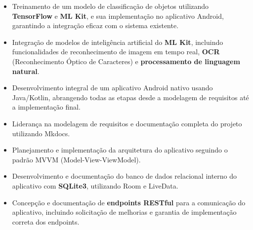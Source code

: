 \documentclass[a4paper,12pt]{article}
\begin{document}
\vspace{-0.5em}
\begin{itemize}
    \item Treinamento de um modelo de classificação de objetos utilizando \textbf{TensorFlow} e\textbf{ ML Kit}, e sua implementação no aplicativo Android, garantindo a integração eficaz com o sistema existente.
    \item Integração de modelos de inteligência artificial do \textbf{ML Kit}, incluindo funcionalidades de reconhecimento de imagem em tempo real, \textbf{OCR} (Reconhecimento Óptico de Caracteres) e \textbf{processamento de linguagem natural}.
    \item Desenvolvimento integral de um aplicativo Android nativo usando Java/Kotlin, abrangendo todas as etapas desde a modelagem de requisitos até a implementação final.
    \item Liderança na modelagem de requisitos e documentação completa do projeto utilizando Mkdocs.
    \item Planejamento e implementação da arquitetura do aplicativo seguindo o padrão MVVM (Model-View-ViewModel).
    \item Desenvolvimento e documentação do banco de dados relacional interno do aplicativo com \textbf{SQLite3}, utilizando Room e LiveData.
    \item Concepção e documentação de \textbf{endpoints RESTful} para a comunicação do aplicativo, incluindo solicitação de melhorias e garantia de implementação correta dos endpoints.
\end{itemize}



\end{document}
